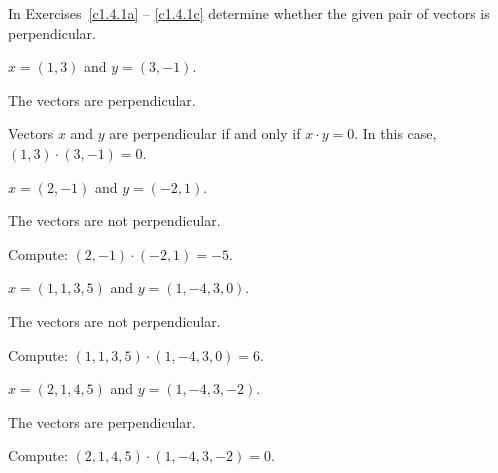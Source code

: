 \documentclass{ximera}
\begin{document}
\noindent In Exercises~\ref{c1.4.1a} -- \ref{c1.4.1c} determine
whether the given pair of vectors is perpendicular.
\begin{exercise} \label{c1.4.1a}
  $x=(1,3)$ and $y=(3,-1)$.

\begin{solution}
\ans The vectors are perpendicular.

\soln Vectors $x$ and $y$ are perpendicular if and only if $x \cdot y = 0$.
In this case, $(1,3) \cdot (3,-1) = 0$.

\end{solution}
\end{exercise}
\begin{exercise} \label{c1.4.1b}
  $x=(2,-1)$ and $y=(-2,1)$.

\begin{solution}
\ans The vectors are not perpendicular.

\soln Compute: $(2,-1) \cdot (-2,1) = -5$.

\end{solution}
\end{exercise}
\begin{exercise} \label{c1.4.1bb}
  $x=(1,1,3,5)$ and $y=(1,-4,3,0)$.

\begin{solution}
\ans The vectors are not perpendicular.

\soln Compute: $(1,1,3,5) \cdot (1,-4,3,0) = 6$.

\end{solution}
\end{exercise}
\begin{exercise} \label{c1.4.1c}
  $x=(2,1,4,5)$ and $y=(1,-4,3,-2)$.

\begin{solution}
\ans The vectors are perpendicular.

\soln Compute: $(2,1,4,5) \cdot (1,-4,3,-2) = 0$.

\end{solution}
\end{exercise}
\end{document}

